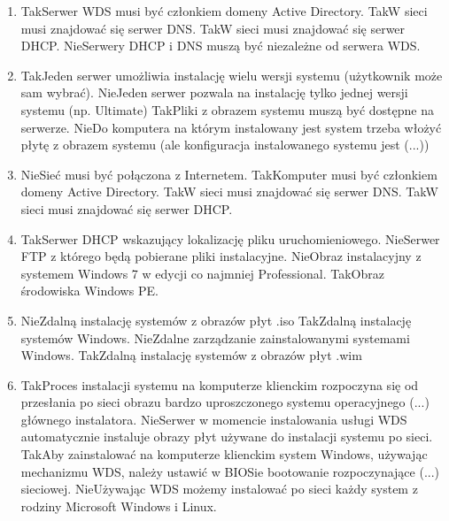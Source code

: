 \begin{enumerate}
		{Tak}{Kontroler domeny, serwer DNS, serwer DHCP}
		\item {}%
		{Tak}{Serwer WDS musi być członkiem domeny Active Directory.}%
		{Tak}{W sieci musi znajdować się serwer DNS.}%
		{Tak}{W sieci musi znajdować się serwer DHCP.}%
		{Nie}{Serwery DHCP i DNS muszą być niezależne od serwera WDS.}
		\item {}%
		{Tak}{Jeden serwer umożliwia instalację wielu wersji systemu (użytkownik może sam wybrać).}%
		{Nie}{Jeden serwer pozwala na instalację tylko jednej wersji systemu (np. Ultimate)}%
		{Tak}{Pliki z obrazem systemu muszą być dostępne na serwerze.}%
		{Nie}{Do komputera na którym instalowany jest system trzeba włożyć płytę z obrazem systemu (ale konfiguracja instalowanego systemu jest (...))}
		\item {}%
		{Nie}{Sieć musi być połączona z Internetem.}%
		{Tak}{Komputer musi być członkiem domeny Active Directory.}%
		{Tak}{W sieci musi znajdować się serwer DNS.}%
		{Tak}{W sieci musi znajdować się serwer DHCP.}
		\item {}%
		{Tak}{Serwer DHCP wskazujący lokalizację pliku uruchomieniowego.}%
		{Nie}{Serwer FTP z którego będą pobierane pliki instalacyjne.}%
		{Nie}{Obraz instalacyjny z systemem Windows 7 w edycji co najmniej Professional.}%
		{Tak}{Obraz środowiska Windows PE.}
		\item {}%
		{Nie}{Zdalną instalację systemów z obrazów płyt .iso}%
		{Tak}{Zdalną instalację systemów Windows.}%
		{Nie}{Zdalne zarządzanie zainstalowanymi systemami Windows.}%
		{Tak}{Zdalną instalację systemów z obrazów płyt .wim}
		\item {}%
		{Tak}{Proces instalacji systemu na komputerze klienckim rozpoczyna się od przesłania po sieci obrazu bardzo uproszczonego systemu operacyjnego (...) głównego instalatora.}%
		{Nie}{Serwer w momencie instalowania usługi WDS automatycznie instaluje obrazy płyt używane do instalacji systemu po sieci.}%
		{Tak}{Aby zainstalować na komputerze klienckim system Windows, używając mechanizmu WDS, należy ustawić w BIOSie bootowanie rozpoczynające (...) sieciowej.}%
		{Nie}{Używając WDS możemy instalować po sieci każdy system z rodziny Microsoft Windows i Linux.}

\end{enumerate}
